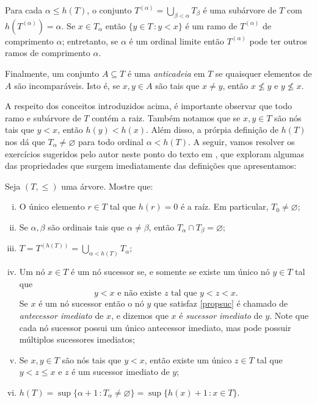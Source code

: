 \documentclass[a4paper]{article}
\theoremstyle{plain}\newtheorem{teo}{Teorema}[section]
\theoremstyle{plain}\newtheorem{prop}[teo]{Proposição}
\theoremstyle{plain}\newtheorem{lem}[teo]{Lema}
\theoremstyle{plain}\newtheorem{cor}[teo]{Corolário}
\theoremstyle{definition}\newtheorem{defi}[teo]{Definição}
\theoremstyle{remark}\newtheorem{rem}[teo]{Observação}
\theoremstyle{definition}\newtheorem{example}[teo]{Exemplo}
\theoremstyle{remark}\newtheorem{step}{\bf Step}
\begin{document}
 Para cada \(\alpha\leq h(T)\), o conjunto \(T^{(\alpha)}=\bigcup_{\beta <
   \alpha} T_\beta\) é uma subárvore de \(T\) com  \(h(T^{(\alpha)})=\alpha\).
 Se \(x\in T_\alpha\) então \(\{y\in T\,\colon y < x\}\) é um ramo de \(T^{(\alpha)}\) de
comprimento \(\alpha\); entretanto, se \(\alpha\) é um ordinal limite então
\(T^{(\alpha)}\) pode ter outros ramos de comprimento \(\alpha\).

Finalmente, um conjunto \(A\subseteq T\) é uma \emph{anticadeia} em \(T\) se
quaisquer elementos de \(A\) são incomparáveis. Isto é, se \(x,y\in A\) são tais
que \(x\not = y\), então \(x\not \leq y\) e \(y\not \leq x\).

A respeito dos conceitos introduzidos acima, é importante observar que todo
ramo e subárvore de \(T\) contém a raiz. Também notamos que se \(x,y\in T\)
são nós tais que \(y< x\), então \(h(y) <h(x)\). Além disso, a prórpia definição
de \(h(T)\) nos dá que \(T_\alpha\not=\varnothing\) para todo ordinal
\(\alpha<h(T)\). A seguir, vamos resolver os
exercícios sugeridos pelo autor neste ponto do texto em \cite{jech},
que exploram algumas das propriedades que surgem imediatamente das
definições que apresentamos:

\begin{exercicio}
  Seja \((T,\leq)\) uma árvore. Mostre que:
  \begin{enumerate}[(i)]
  \item O único elemento \(r \in T\) tal que \(h(r)=0\) é a raíz. Em particular,
    \(T_0\not =\varnothing\);
  \item Se \(\alpha,\beta\) são ordinais tais que \(\alpha\not = \beta\), então \(T_\alpha\cap T_\beta =\varnothing\);
  \item \(T=T^{(h(T))}=\bigcup_{\alpha < h(T)}T_\alpha\);
  \item Um nó \(x\in T\) é um nó sucessor se, e somente se existe um único nó \(y\in T\) tal que
    \begin{equation}\label{propsuc}
      y < x \text{ e não existe } z \text{ tal que } y<z<x.
    \end{equation}
    Se \(x\) é um nó sucessor então o nó
    \(y\) que satisfaz \eqref{propsuc}  é chamado de \emph{antecessor imediato} de
    \(x\), e dizemos que \(x\) é \emph{sucessor imediato} de \(y\).
    Note que cada nó sucessor possui um único antecessor imediato,
    mas pode possuir múltiplos sucessores imediatos;
    \item Se \(x,y\in T\) são nós tais que \(y< x\), então existe um único \(z\in T\) tal que \(y< z\leq x\) e
      \(z\) é um sucessor imediato de \(y\);
    \item \(h(T)=\sup\{\alpha +1\,\colon
      T_\alpha\not=\varnothing\}=\sup\{h(x)+1\,\colon x\in T\}.\)
    \end{enumerate}
  \end{exercicio}
  
\end{document}
